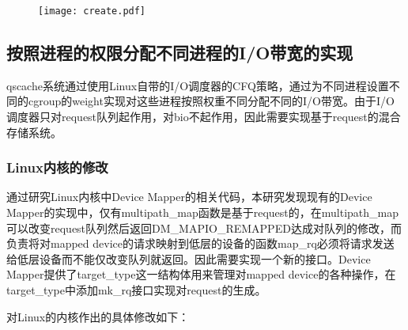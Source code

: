 \begin{figure}[!htp]
    \centering
    \texttt{[image: create.pdf]}
\end{figure}

\subsection{按照进程的权限分配不同进程的I/O带宽的实现}

qscache系统通过使用Linux自带的I/O调度器的CFQ策略，通过为不同进程设置不同的cgroup的weight实现对这些进程按照权重不同分配不同的I/O带宽。由于I/O调度器只对request队列起作用，对bio不起作用，因此需要实现基于request的混合存储系统。

\subsubsection{Linux内核的修改}

通过研究Linux内核中Device Mapper的相关代码，本研究发现现有的Device Mapper的实现中，仅有multipath\_map函数是基于request的，在multipath\_map可以改变request队列然后返回DM\_MAPIO\_REMAPPED达成对队列的修改，而负责将对mapped device的请求映射到低层的设备的函数map\_rq必须将请求发送给低层设备而不能仅改变队列就返回。因此需要实现一个新的接口。Device Mapper提供了target\_type这一结构体用来管理对mapped device的各种操作，在target\_type中添加mk\_rq接口实现对request的生成。

对Linux的内核作出的具体修改如下：

